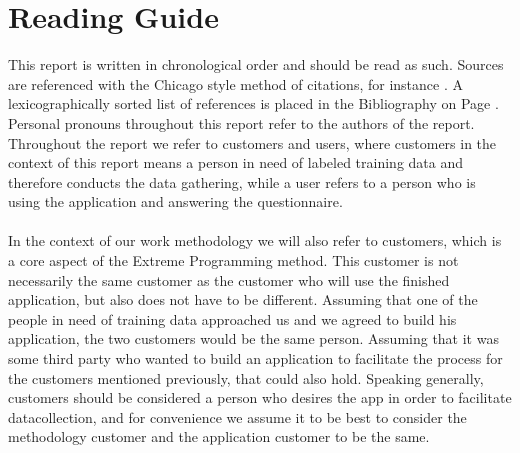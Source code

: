 
\section*{Reading Guide}

This report is written in chronological order and should be read as such. Sources are referenced with the Chicago style method of citations, for instance \parencite{android_adb}. A lexicographically sorted list of references is placed in the Bibliography on Page \pageref{bibliografi}. Personal pronouns throughout this report refer to the authors of the report. Throughout the report we refer to customers and users, where customers in the context of this report means a person in need of labeled training data and therefore conducts the data gathering, while a user refers to a person who is using the application and answering the questionnaire. 
\\\\
In the context of our work methodology we will also refer to customers, which is a core aspect of the Extreme Programming method. This customer is not necessarily the same customer as the customer who will use the finished application, but also does not have to be different. Assuming that one of the people in need of training data approached us and we agreed to build his application, the two customers would be the same person. Assuming that it was some third party who wanted to build an application to facilitate the process for the customers mentioned previously, that could also hold. Speaking generally, customers should be considered a person who desires the app in order to facilitate datacollection, and for convenience we assume it to be best to consider the methodology customer and the application customer to be the same. 